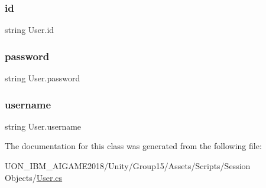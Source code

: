\mbox{\label{class_user_aeec50df41e3fc646fbf1ddf3a825fe49}} 
\subsubsection{\texorpdfstring{id}{id}}
{\footnotesize\ttfamily string User.\+id}

\mbox{\label{class_user_a114fb9fd8c0362bd1298c6248ca68f5d}} 
\subsubsection{\texorpdfstring{password}{password}}
{\footnotesize\ttfamily string User.\+password}

\mbox{\label{class_user_a31bab5f53b917b7253a3210123eacf7b}} 
\subsubsection{\texorpdfstring{username}{username}}
{\footnotesize\ttfamily string User.\+username}



The documentation for this class was generated from the following file\+:\begin{DoxyCompactItemize}
\item 
U\+O\+N\+\_\+\+I\+B\+M\+\_\+\+A\+I\+G\+A\+M\+E2018/\+Unity/\+Group15/\+Assets/\+Scripts/\+Session Objects/\mbox{\hyperlink{_user_8cs}{User.\+cs}}\end{DoxyCompactItemize}
